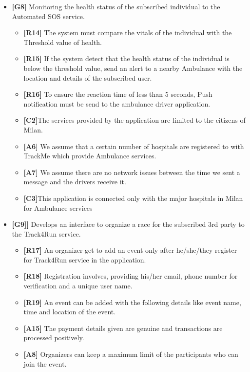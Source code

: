 \begin{itemize}
\item\textbf{[G8]} Monitoring the health status of the subscribed individual to the Automated SOS service.

\begin{itemize}
\item\textbf{[R14]} The system must compare the vitals of the individual with the Threshold value of health.
\item\textbf{[R15]} If the system detect that the health status of the individual is below the threshold value, send an alert to a nearby Ambulance with the location and details of the subscribed user.
\item\textbf{[R16]} To ensure the reaction time of less than 5 seconds, Push notification must be send to the ambulance driver application.
\item\textbf{[C2]}The services provided by the application are limited to the citizens of Milan.
\item \textbf{[A6]} We assume that a certain number of hospitals are registered to with TrackMe which provide Ambulance services.
\item \textbf{[A7]} We assume there are no network issues between the time we sent a message and the drivers receive it.
\item\textbf{[C3]}This application is connected only with the major hospitals in Milan for Ambulance services\newline
\end{itemize}

\item\textbf{[G9]]}  Develops an interface to organize a race for the subscribed 3rd party to the Track4Run service.

\begin{itemize}
\item\textbf{[R17]} An organizer get to add an event only after he/she/they register for Track4Run service in the application.
\item\textbf{[R18]} Registration involves, providing his/her email, phone number for verification and a unique user name.
\item\textbf{[R19]} An event can be added with the following details like event name, time and location of the event.
\item\textbf{[A15]} The payment details given are genuine and transactions are processed positively.
\item\textbf{[A8]} Organizers can keep a maximum limit of the participants who can join the event.\newline
\end{itemize}


\end{itemize}
